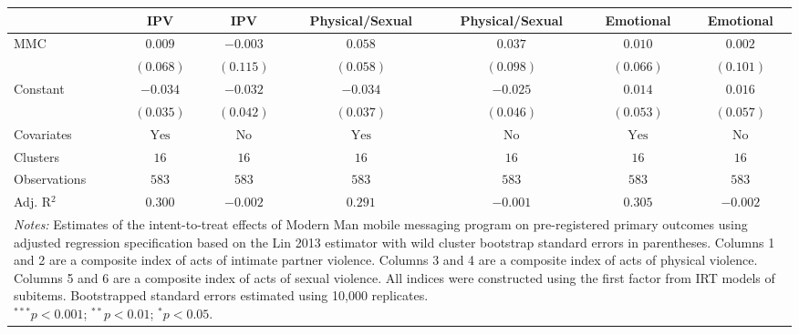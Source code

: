 
\begin{tabular}{l c c c c c c}
\toprule
 & IPV & IPV & Physical/Sexual & Physical/Sexual & Emotional & Emotional \\
\midrule
MMC          & $0.009$        & $-0.003$      & $0.058$        & $0.037$       & $0.010$        & $0.002$       \\
             & $(0.068)$      & $(0.115)$     & $(0.058)$      & $(0.098)$     & $(0.066)$      & $(0.101)$     \\
Constant     & $-0.034$       & $-0.032$      & $-0.034$       & $-0.025$      & $0.014$        & $0.016$       \\
             & $(0.035)$      & $(0.042)$     & $(0.037)$      & $(0.046)$     & $(0.053)$      & $(0.057)$     \\
\midrule
Covariates   & $\textrm{Yes}$ & $\textrm{No}$ & $\textrm{Yes}$ & $\textrm{No}$ & $\textrm{Yes}$ & $\textrm{No}$ \\
Clusters     & $16$           & $16$          & $16$           & $16$          & $16$           & $16$          \\
Observations & $583$          & $583$         & $583$          & $583$         & $583$          & $583$         \\
Adj. R$^2$   & $0.300$        & $-0.002$      & $0.291$        & $-0.001$      & $0.305$        & $-0.002$      \\
\bottomrule
\multicolumn{7}{l}{\scriptsize{\parbox{\linewidth}{\vspace{2pt} 
       \textit{Notes:} Estimates of the intent-to-treat effects of Modern Man mobile 
       messaging program on pre-registered primary outcomes using adjusted regression 
       specification based on the Lin 2013 estimator with wild cluster bootstrap 
       standard errors in parentheses. Columns 1 and 2 are a composite index of 
       acts of intimate partner violence. Columns 3 and 4 are a composite index of acts
       of physical violence. Columns 5 and 6 are a composite index of acts of sexual violence.
       All indices were constructed using the first factor from IRT models of subitems. 
       Bootstrapped standard errors estimated using 10,000 replicates. \\ $^{***}p<0.001$; $^{**}p<0.01$; $^{*}p<0.05$.}}}
\end{tabular}
